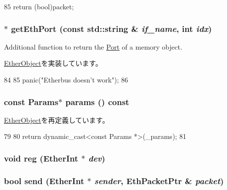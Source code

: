 \begin{DoxyCode}
85 { return (bool)packet; }
\end{DoxyCode}
\hypertarget{classEtherBus_a10260c5a583c0894dcdcd1ced50a53ae}{
\subsubsection[{getEthPort}]{ $\ast$ getEthPort (const std::string \& {\em if\_\-name}, \/  int {\em idx})}}
\label{classEtherBus_a10260c5a583c0894dcdcd1ced50a53ae}
Additional function to return the \hyperlink{classPort}{Port} of a memory object. 

\hyperlink{classEtherObject_ac1aa24c1f8c0f1ee8bdc3f3d3799f67c}{EtherObject}を実装しています。


\begin{DoxyCode}
84 {
85     panic("Etherbus doesn't work\n");
86 }
\end{DoxyCode}
\hypertarget{classEtherBus_acd3c3feb78ae7a8f88fe0f110a718dff}{
\subsubsection[{params}]{\setlength{\rightskip}{0pt plus 5cm}const {\bf Params}$\ast$ params () const}}
\label{classEtherBus_acd3c3feb78ae7a8f88fe0f110a718dff}


\hyperlink{classEtherObject_acd3c3feb78ae7a8f88fe0f110a718dff}{EtherObject}を再定義しています。


\begin{DoxyCode}
79     {
80         return dynamic_cast<const Params *>(_params);
81     }
\end{DoxyCode}
\hypertarget{classEtherBus_a97ce707445b2b82e64a1cd5a981d5ad5}{
\subsubsection[{reg}]{\setlength{\rightskip}{0pt plus 5cm}void reg ({\bf EtherInt} $\ast$ {\em dev})}}
\label{classEtherBus_a97ce707445b2b82e64a1cd5a981d5ad5}
\hypertarget{classEtherBus_af0ac5d7bc5c392555ef3176bd27292f4}{
\subsubsection[{send}]{\setlength{\rightskip}{0pt plus 5cm}bool send ({\bf EtherInt} $\ast$ {\em sender}, \/  {\bf EthPacketPtr} \& {\em packet})}}
\label{classEtherBus_af0ac5d7bc5c392555ef3176bd27292f4}



